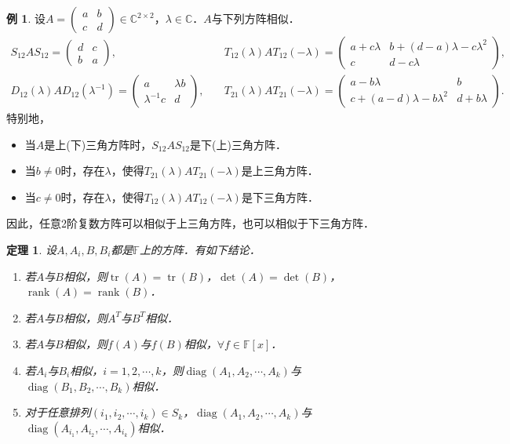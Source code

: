 \documentclass[a4paper,fontset=windows]{ctexbook}
\newtheorem{theorem}{定理}[chapter]
\theoremstyle{definition}
\newtheorem{example}{例}[chapter]
\DeclareMathOperator{\diag}{diag}
\DeclareMathOperator{\rank}{rank}
\DeclareMathOperator{\tr}{tr}
\begin{document}
\begin{example}
设$A=\begin{pmatrix}a&b \\ c&d\end{pmatrix}\in\mathbb{C}^{2\times 2}$，$\lambda\in\mathbb{C}$．$A$与下列方阵相似．
$$\begin{array}{ll}
S_{12}AS_{12}=\begin{pmatrix}d&c \\ b&a\end{pmatrix},
& T_{12}(\lambda)AT_{12}(-\lambda)=\begin{pmatrix}a+c\lambda&b+(d-a)\lambda-c\lambda^2 \\ c&d-c\lambda\end{pmatrix}, \\
D_{12}(\lambda)AD_{12}(\lambda^{-1})=\begin{pmatrix}a&\lambda b \\ \lambda^{-1}c&d\end{pmatrix},\quad
&T_{21}(\lambda)AT_{21}(-\lambda)=\begin{pmatrix}a-b\lambda&b \\ c+(a-d)\lambda-b\lambda^2&d+b\lambda\end{pmatrix}.
\end{array}$$
特别地，
\begin{itemize}
\item 当$A$是上(下)三角方阵时，$S_{12}AS_{12}$是下(上)三角方阵．

\item 当$b\ne 0$时，存在$\lambda$，使得$T_{21}(\lambda)AT_{21}(-\lambda)$是上三角方阵．

\item 当$c\ne 0$时，存在$\lambda$，使得$T_{12}(\lambda)AT_{12}(-\lambda)$是下三角方阵．
\end{itemize}
因此，任意2阶复数方阵可以相似于上三角方阵，也可以相似于下三角方阵．
\end{example}

\begin{theorem}\label{thm5.1}
设$A,A_i,B,B_i$都是$\mathbb{F}$上的方阵．有如下结论．
\begin{enumerate}
\item 若$A$与$B$相似，则$\tr(A)=\tr(B)$，$\det(A)=\det(B)$，$\rank(A)=\rank(B)$．

\item 若$A$与$B$相似，则$A^T$与$B^T$相似．

\item 若$A$与$B$相似，则$f(A)$与$f(B)$相似，$\forall f\in\mathbb{F}[x]$．

\item 若$A_i$与$B_i$相似，$i=1,2,\cdots,k$，则$\diag(A_1,A_2,\cdots,A_k)$与$\diag(B_1,B_2,\cdots,B_k)$相似．

\item 对于任意排列$(i_1,i_2,\cdots,i_k)\in S_k$，$\diag(A_1,A_2,\cdots,A_k)$与$\diag(A_{i_1},A_{i_2},\cdots,A_{i_k})$相似．
\end{enumerate}
\end{theorem}
\end{document}
